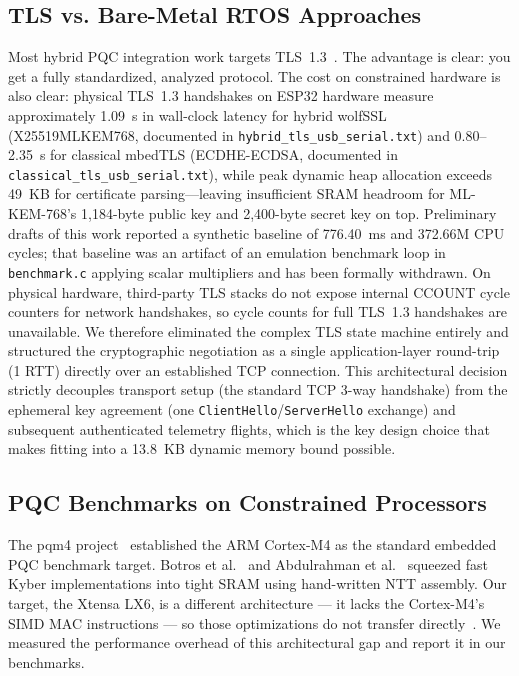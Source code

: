 \documentclass[journal, 10pt]{IEEEtran}
\begin{document}
\subsection{TLS vs. Bare-Metal RTOS Approaches}
Most hybrid PQC integration work targets TLS~1.3~\cite{b14,b16,b17,b21,b34,b38}. The advantage is clear: you get a fully standardized, analyzed protocol. The cost on constrained hardware is also clear: physical TLS~1.3 handshakes on ESP32 hardware measure approximately 1.09~s in wall-clock latency for hybrid wolfSSL (X25519MLKEM768, documented in \texttt{hybrid\_tls\_usb\_serial.txt}) and 0.80--2.35~s for classical mbedTLS (ECDHE-ECDSA, documented in \texttt{classical\_tls\_usb\_serial.txt}), while peak dynamic heap allocation exceeds 49~KB for certificate parsing---leaving insufficient SRAM headroom for ML-KEM-768's 1,184-byte public key and 2,400-byte secret key on top. Preliminary drafts of this work reported a synthetic baseline of 776.40~ms and 372.66M CPU cycles; that baseline was an artifact of an emulation benchmark loop in \texttt{benchmark.c} applying scalar multipliers and has been formally withdrawn. On physical hardware, third-party TLS stacks do not expose internal CCOUNT cycle counters for network handshakes, so cycle counts for full TLS~1.3 handshakes are unavailable. We therefore eliminated the complex TLS state machine entirely and structured the cryptographic negotiation as a single application-layer round-trip (1 RTT) directly over an established TCP connection. This architectural decision strictly decouples transport setup (the standard TCP 3-way handshake) from the ephemeral key agreement (one \texttt{ClientHello}/\texttt{ServerHello} exchange) and subsequent authenticated telemetry flights, which is the key design choice that makes fitting into a 13.8~KB dynamic memory bound possible.

\subsection{PQC Benchmarks on Constrained Processors}
The pqm4 project~\cite{b7} established the ARM Cortex-M4 as the standard embedded PQC benchmark target. Botros et al.~\cite{b6} and Abdulrahman et al.~\cite{b12} squeezed fast Kyber implementations into tight SRAM using hand-written NTT assembly. Our target, the Xtensa LX6, is a different architecture — it lacks the Cortex-M4's SIMD MAC instructions — so those optimizations do not transfer directly~\cite{b11}. We measured the performance overhead of this architectural gap and report it in our benchmarks.
\end{document}
